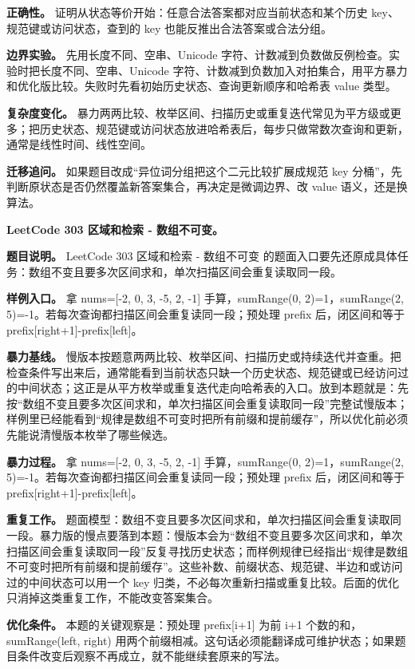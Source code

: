 \textbf{正确性。} 证明从状态等价开始：任意合法答案都对应当前状态和某个历史 key、规范键或访问状态，查到的 key 也能反推出合法答案或合法分组。

\textbf{边界实验。} 先用长度不同、空串、Unicode 字符、计数减到负数做反例检查。实验时把长度不同、空串、Unicode 字符、计数减到负数加入对拍集合，用平方暴力和优化版比较。失败时先看初始历史状态、查询更新顺序和哈希表 value 类型。

\textbf{复杂度变化。} 暴力两两比较、枚举区间、扫描历史或重复迭代常见为平方级或更多；把历史状态、规范键或访问状态放进哈希表后，每步只做常数次查询和更新，通常是线性时间、线性空间。

\textbf{迁移追问。} 如果题目改成“异位词分组把这个二元比较扩展成规范 key 分桶”，先判断原状态是否仍然覆盖新答案集合，再决定是微调边界、改 value 语义，还是换算法。

\noindent\textbf{LeetCode 303 区域和检索 - 数组不可变。}

\textbf{题目说明。} LeetCode 303 区域和检索 - 数组不可变 的题面入口要先还原成具体任务：数组不变且要多次区间求和，单次扫描区间会重复读取同一段。

\textbf{样例入口。} 拿 nums=[-2, 0, 3, -5, 2, -1] 手算，sumRange(0, 2)=1，sumRange(2, 5)=-1。若每次查询都扫描区间会重复读同一段；预处理 prefix 后，闭区间和等于 prefix[right+1]-prefix[left]。

\textbf{暴力基线。} 慢版本按题意两两比较、枚举区间、扫描历史或持续迭代并查重。把检查条件写出来后，通常能看到当前状态只缺一个历史状态、规范键或已经访问过的中间状态；这正是从平方枚举或重复迭代走向哈希表的入口。放到本题就是：先按“数组不变且要多次区间求和，单次扫描区间会重复读取同一段”完整试慢版本；样例里已经能看到“规律是数组不可变时把所有前缀和提前缓存”，所以优化前必须先能说清慢版本枚举了哪些候选。

\textbf{暴力过程。} 拿 nums=[-2, 0, 3, -5, 2, -1] 手算，sumRange(0, 2)=1，sumRange(2, 5)=-1。若每次查询都扫描区间会重复读同一段；预处理 prefix 后，闭区间和等于 prefix[right+1]-prefix[left]。

\textbf{重复工作。} 题面模型：数组不变且要多次区间求和，单次扫描区间会重复读取同一段。暴力版的慢点要落到本题：慢版本会为“数组不变且要多次区间求和，单次扫描区间会重复读取同一段”反复寻找历史状态；而样例规律已经指出“规律是数组不可变时把所有前缀和提前缓存”。这些补数、前缀状态、规范键、半边和或访问过的中间状态可以用一个 key 归类，不必每次重新扫描或重复比较。后面的优化只消掉这类重复工作，不能改变答案集合。

\textbf{优化条件。} 本题的关键观察是：预处理 prefix[i+1] 为前 i+1 个数的和，sumRange(left, right) 用两个前缀相减。这句话必须能翻译成可维护状态；如果题目条件改变后观察不再成立，就不能继续套原来的写法。

